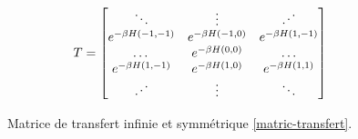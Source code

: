 \begin{figure}
    \begin{align}
    T = \begin{bmatrix} 
            \ddots & \vdots & \reflectbox{$\ddots$} \\ 
            e^{-\beta H(-1,-1)} &  e^{-\beta H(-1,0)} & e^{-\beta H(1,-1)} \\
            \dots & e^{-\beta H(0,0)} & \dots  \\
            e^{-\beta H(1,-1)} & e^{-\beta H(1,0)} & e^{-\beta H(1,1)}   \\ 
             \reflectbox{$\ddots$} & \vdots &\ddots  \\ 
        \end{bmatrix}
    \end{align}
    \caption{Matrice de transfert infinie et symmétrique \ref{matric-transfert}.}
\end{figure}

